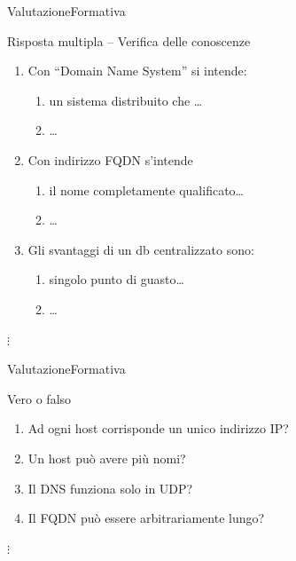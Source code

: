 \documentclass[italian]{beamer}
\begin{document}
\begin{frame}{Valutazione}{Formativa}
	\begin{block}{Risposta multipla -- Verifica delle conoscenze}
		\begin{enumerate}
			\item Con ``Domain Name System'' si intende:
			\begin{enumerate}[a]
				\item un sistema distribuito che \ldots
				\item \ldots
			\end{enumerate}
			
			\item Con indirizzo FQDN s'intende
			\begin{enumerate}[a]
				\item il nome completamente qualificato\ldots
				\item \ldots
			\end{enumerate}
			
			\item Gli svantaggi di un db centralizzato sono:
			\begin{enumerate}[a]
				\item singolo punto di guasto\ldots
				\item \ldots
			\end{enumerate}
			
		\end{enumerate}\hspace{0.45cm}$\vdots$

	\end{block}
\end{frame}

\begin{frame}{Valutazione}{Formativa}
	\begin{block}{Vero o falso }
		\begin{enumerate}
			\item Ad ogni host corrisponde un unico indirizzo IP?
			\item Un host pu\`o avere pi\`u nomi?
			\item Il DNS funziona solo in UDP?
			\item Il FQDN pu\`o essere arbitrariamente lungo?
		\end{enumerate}\hspace{0.45cm}$\vdots$

	\end{block}
\end{frame}
\end{document}
